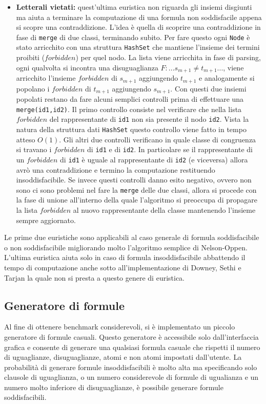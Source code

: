\documentclass[a4paper,11pt]{article}
\begin{document}
\begin{itemize}
	\item {\bf Letterali vietati:} quest'ultima euristica non riguarda gli insiemi disgiunti ma aiuta a terminare la computazione di una formula non soddisfacile appena si scopre una contraddizione.
L'idea è quella di scoprire una contraddizione in fase di {\tt merge} di due classi, terminando subito.
Per fare questo ogni {\tt Node} è stato arricchito con una struttura {\tt HashSet} che mantiene l'insieme dei termini proibiti ($forbidden$) per quel nodo.
La lista viene arricchita in fase di parsing, ogni qualvolta si incontra una disuguaglianza
$F: ... s_{m+1} \not= t_{m+1} ... $, viene arricchito l'insieme $forbidden$ di $s_{m+1}$ aggiungendo $t_{m+1}$ e analogamente si popolano i $forbidden$ di $t_{m+1}$ aggiungendo $s_{m+1}$.
Con questi due insiemi popolati restano da fare alcuni semplici controlli prima di effettuare una {\tt merge(id1,id2)}.
Il primo controllo consiste nel verificare che nella lista $forbidden$ del rappresentante di {\tt id1} non sia presente il nodo {\tt id2}.
Vista la natura della struttura dati {\tt HashSet} questo controllo viene fatto in tempo atteso $O(1)$.
Gli altri due controlli verificano in quale classe di congruenza si travano i $forbidden$ di {\tt id1} e di {\tt id2}.
In particolare se il rappresentante di un $forbidden$ di {\tt id1} è uguale al rappresentante di {\tt id2} (e viceversa) allora avrò una contraddizione e termino la computazione restituendo insoddisfacibile.
Se invece questi controlli danno esito negativo, ovvero non sono ci sono problemi nel fare la {\tt merge} delle due classi, allora si procede con la fase di unione all'interno della quale l'algoritmo si preoccupa di propagare la lista $forbidden$ al nuovo rappresentante della classe mantenendo l'insieme sempre aggiornato.
\end{itemize}
Le prime due euristiche sono applicabili al caso generale di formula soddisfacibile o non soddisfacibile migliorando molto l'algoritmo semplice di Nelson-Oppen.
L'ultima euristica aiuta solo in caso di formula insoddisfacibile abbattendo il tempo di computazione anche sotto all'implementazione di Downey, Sethi e Tarjan la quale non si presta a questo genere di euristica.
\subsection{Generatore di formule}
Al fine di ottenere benchmark considerevoli, si è implementato un piccolo generatore di formule casuali.
Questo generatore è accessibile solo dall'interfaccia grafica e consente di generare una qualsiasi formula casuale che rispetti il numero di uguaglianze, disuguaglianze, atomi e non atomi impostati dall'utente.
La probabilità di generare formule insoddisfacibili è molto alta ma specificando solo clausole di uguaglianza, o un numero considerevole di formule di ugualianza e un numero molto inferiore di disuguaglianze, è possibile generare formule soddisfacibili.
\end{document}
